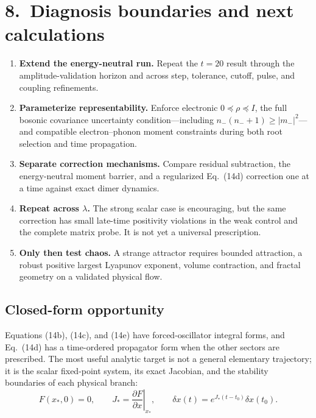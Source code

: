 \documentclass[10pt]{article}
\begin{document}
\section*{8.\ Diagnosis boundaries and next calculations}

\begin{enumerate}
  \item \textbf{Extend the energy-neutral run.} Repeat the \(t=20\) result
  through the amplitude-validation horizon and across step, tolerance,
  cutoff, pulse, and coupling refinements.

  \item \textbf{Parameterize representability.} Enforce electronic
  \(0\preceq\rho\preceq I\), the full bosonic covariance uncertainty
  condition---including \(n_-(n_-+1)\ge|m_-|^2\)---and compatible
  electron--phonon moment constraints during both root selection and time
  propagation.

  \item \textbf{Separate correction mechanisms.} Compare residual subtraction,
  the energy-neutral moment barrier, and a regularized Eq.~(14d) correction
  one at a time against exact dimer dynamics.

  \item \textbf{Repeat across \(\lambda\).} The strong scalar case is
  encouraging, but the same correction has small late-time positivity
  violations in the weak control and the complete matrix probe. It is not yet
  a universal prescription.

  \item \textbf{Only then test chaos.} A strange attractor requires bounded
  attraction, a robust positive largest Lyapunov exponent, volume contraction,
  and fractal geometry on a validated physical flow.
\end{enumerate}

\subsection*{Closed-form opportunity}

Equations (14b), (14c), and (14e) have forced-oscillator integral forms, and
Eq.~(14d) has a time-ordered propagator form when the other sectors are
prescribed. The most useful analytic target is not a general elementary
trajectory; it is the scalar fixed-point system, its exact Jacobian, and the
stability boundaries of each physical branch:
\[
F(x_\ast,0)=0,
\qquad
J_\ast=\left.\frac{\partial F}{\partial x}\right|_{x_\ast},
\qquad
\delta x(t)=e^{J_\ast(t-t_0)}\delta x(t_0).
\]
\end{document}
